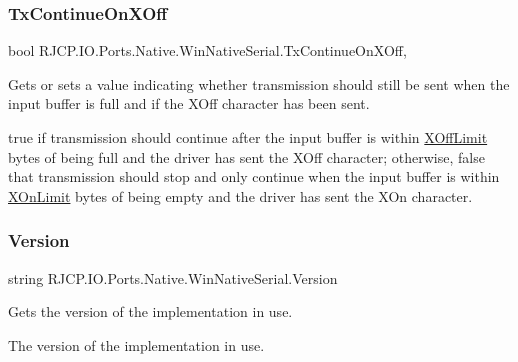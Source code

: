 \subsubsection{\texorpdfstring{TxContinueOnXOff}{TxContinueOnXOff}}
{\footnotesize\ttfamily bool R\+J\+C\+P.\+I\+O.\+Ports.\+Native.\+Win\+Native\+Serial.\+Tx\+Continue\+On\+X\+Off\hspace{0.3cm}{\ttfamily [get]}, {\ttfamily [set]}}



Gets or sets a value indicating whether transmission should still be sent when the input buffer is full and if the X\+Off character has been sent. 

{\ttfamily true} if transmission should continue after the input buffer is within \mbox{\hyperlink{class_r_j_c_p_1_1_i_o_1_1_ports_1_1_native_1_1_win_native_serial_ac4878755331de1a7ad9f30d50ddf8928}{X\+Off\+Limit}} bytes of being full and the driver has sent the X\+Off character; otherwise, {\ttfamily false} that transmission should stop and only continue when the input buffer is within \mbox{\hyperlink{class_r_j_c_p_1_1_i_o_1_1_ports_1_1_native_1_1_win_native_serial_a33c81ce663d8a1a78c74be34fe80492b}{X\+On\+Limit}} bytes of being empty and the driver has sent the X\+On character. \mbox{\label{class_r_j_c_p_1_1_i_o_1_1_ports_1_1_native_1_1_win_native_serial_af33c3f24df2bd80588552611b850a64d}} 
\subsubsection{\texorpdfstring{Version}{Version}}
{\footnotesize\ttfamily string R\+J\+C\+P.\+I\+O.\+Ports.\+Native.\+Win\+Native\+Serial.\+Version\hspace{0.3cm}{\ttfamily [get]}}



Gets the version of the implementation in use. 

The version of the implementation in use. \mbox{\label{class_r_j_c_p_1_1_i_o_1_1_ports_1_1_native_1_1_win_native_serial_ac4878755331de1a7ad9f30d50ddf8928}} 
